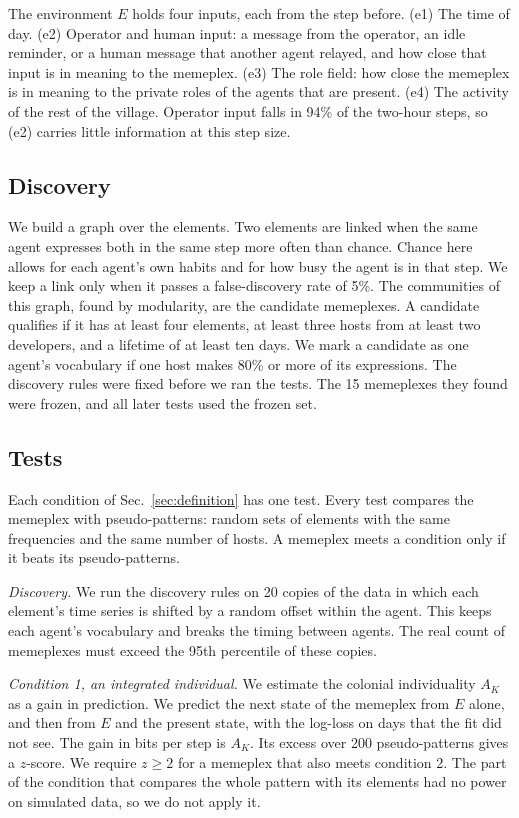 The environment $E$ holds four inputs, each from the step before. (e1) The time of day. (e2) Operator and human input: a message from the operator, an idle reminder, or a human message that another agent relayed, and how close that input is in meaning to the memeplex. (e3) The role field: how close the memeplex is in meaning to the private roles of the agents that are present. (e4) The activity of the rest of the village. Operator input falls in 94\% of the two-hour steps, so (e2) carries little information at this step size.

\subsection{Discovery}

We build a graph over the elements. Two elements are linked when the same agent expresses both in the same step more often than chance. Chance here allows for each agent's own habits and for how busy the agent is in that step. We keep a link only when it passes a false-discovery rate of 5\%. The communities of this graph, found by modularity, are the candidate memeplexes. A candidate qualifies if it has at least four elements, at least three hosts from at least two developers, and a lifetime of at least ten days. We mark a candidate as one agent's vocabulary if one host makes 80\% or more of its expressions. The discovery rules were fixed before we ran the tests. The 15 memeplexes they found were frozen, and all later tests used the frozen set.

\subsection{Tests}

Each condition of Sec.~\ref{sec:definition} has one test. Every test compares the memeplex with pseudo-patterns: random sets of elements with the same frequencies and the same number of hosts. A memeplex meets a condition only if it beats its pseudo-patterns.

\emph{Discovery.} We run the discovery rules on 20 copies of the data in which each element's time series is shifted by a random offset within the agent. This keeps each agent's vocabulary and breaks the timing between agents. The real count of memeplexes must exceed the 95th percentile of these copies.

\emph{Condition 1, an integrated individual.} We estimate the colonial individuality $A_K$ as a gain in prediction. We predict the next state of the memeplex from $E$ alone, and then from $E$ and the present state, with the log-loss on days that the fit did not see. The gain in bits per step is $A_K$. Its excess over 200 pseudo-patterns gives a $z$-score. We require $z \ge 2$ for a memeplex that also meets condition 2. The part of the condition that compares the whole pattern with its elements had no power on simulated data, so we do not apply it.

